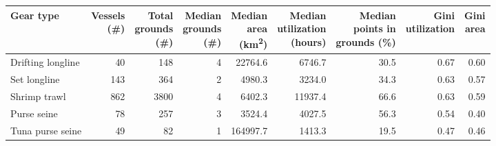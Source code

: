 
\begin{tabular}{lrrrrrrrr}
\toprule
Gear type & \shortstack[r]{Vessels\\(\#)} & \shortstack[r]{Total\\grounds\\(\#)} & \shortstack[r]{Median\\grounds\\(\#)} & \shortstack[r]{Median\\area\\(km\textsuperscript{2})} & \shortstack[r]{Median\\utilization\\(hours)} & \shortstack[r]{Median\\points in\\grounds (\%)} & \shortstack[r]{Gini\\utilization} & \shortstack[r]{Gini\\area}\\
\midrule
Drifting longline & 40 & 148 & 4 & 22764.6 & 6746.7 & 30.5 & 0.67 & 0.60\\
Set longline & 143 & 364 & 2 & 4980.3 & 3234.0 & 34.3 & 0.63 & 0.57\\
Shrimp trawl & 862 & 3800 & 4 & 6402.3 & 11937.4 & 66.6 & 0.63 & 0.59\\
Purse seine & 78 & 257 & 3 & 3524.4 & 4027.5 & 56.3 & 0.54 & 0.40\\
Tuna purse seine & 49 & 82 & 1 & 164997.7 & 1413.3 & 19.5 & 0.47 & 0.46\\
\bottomrule
\end{tabular}

